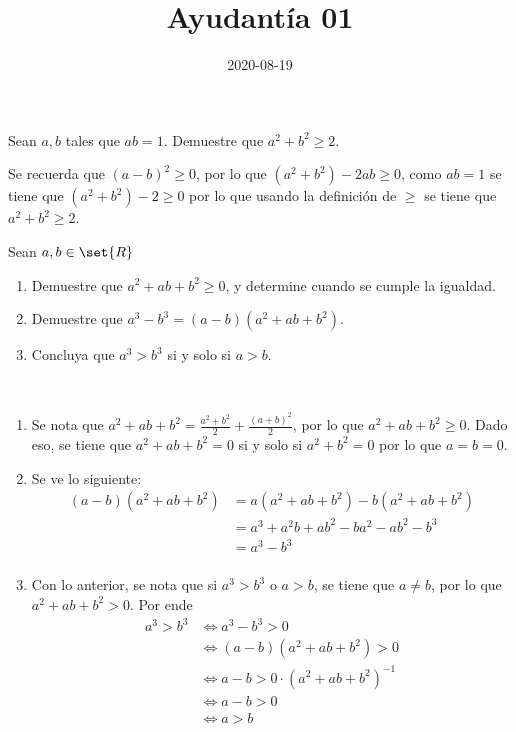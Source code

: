 \documentclass{ayudantia}
\title{Ayudantía 01}
\date{2020-08-19}
\begin{document}
\maketitle

\begin{prob}
    Sean \(a,b\) tales que \(ab=1\). Demuestre que \(a^2+b^2\geq2\).
\end{prob}

\begin{ans}
    \begin{sol}
        Se recuerda que \((a-b)^2\geq0\), por lo que \((a^2+b^2)-2ab\geq0\), como \(ab=1\) se tiene que \((a^2+b^2)-2\geq0\) por lo que usando la definición de \(\geq\) se tiene que \(a^2+b^2\geq2\).
    \end{sol}
\end{ans}


\begin{prob}
    Sean \(a,b\in\set{R}\)
    \begin{enumerate}
        \item Demuestre que \(a^2+ab+b^2\geq0\), y determine cuando se cumple la igualdad.
        \item Demuestre que \(a^3-b^3=(a-b)(a^2+ab+b^2)\).
        \item Concluya que \(a^3>b^3\) si y solo si \(a>b\).
    \end{enumerate}\
\end{prob}

\begin{ans}
    \begin{sol}
        \begin{enumerate}
            \item Se nota que \(a^2+ab+b^2=\frac{a^2+b^2}2+\frac{(a+b)^2}2\), por lo que \(a^2+ab+b^2\geq0\). Dado eso, se tiene que \(a^2+ab+b^2=0\) si y solo si \(a^2+b^2=0\) por lo que \(a=b=0\).
            \item Se ve lo siguiente:
            \begin{align*}
                (a-b)(a^2+ab+b^2)&=a(a^2+ab+b^2)-b(a^2+ab+b^2)\\
                &=a^3+a^2b+ab^2-ba^2-ab^2-b^3\\
                &=a^3-b^3\\
            \end{align*}
            \item Con lo anterior, se nota que si \(a^3>b^3\) o \(a>b\), se tiene que \(a\neq b\), por lo que \(a^2+ab+b^2>0\). Por ende
            \begin{align*}
                a^3>b^3&\iff a^3-b^3>0\\
                &\iff (a-b)(a^2+ab+b^2)>0\\
                &\iff a-b>0\cdot(a^2+ab+b^2)^{-1}\\
                &\iff a-b>0\\
                &\iff a>b\\
            \end{align*}
        \end{enumerate}
    \end{sol}
\end{ans}
\end{document}
